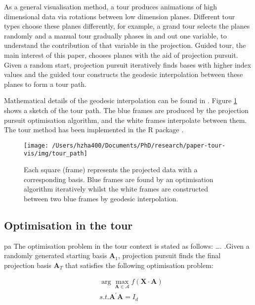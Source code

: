 As a general visualisation method, a tour produces animations of high
dimensional data via rotations between low dimension planes. Different
tour types choose these planes differently, for example, a grand tour
\citep{cook2008grand} selects the planes randomly and a manual tour
\citep{cook1997manual} gradually phases in and out one variable, to
understand the contribution of that variable in the projection. Guided
tour, the main interest of this paper, chooses planes with the aid of
projection pursuit. Given a random start, projection pursuit iteratively
finds bases with higher index values and the guided tour constructs the
geodesic interpolation between these planes to form a tour path.

Mathematical details of the geodesic interpolation can be found in
\citet{buja2005computational}. Figure \ref{fig:tour-path} shows a sketch
of the tour path. The blue frames are produced by the projection pursuit
optimisation algorithm, and the white frames interpolate between them.
The tour method has been implemented in the R package 
\citep{tourr}.

\begin{Schunk}
\begin{figure}

{\centering \texttt{[image: /Users/hzha400/Documents/PhD/research/paper-tour-vis/img/tour\_path]} 

}

\caption[Each square (frame) represents the projected data with a corresponding basis]{Each square (frame) represents the projected data with a corresponding basis. Blue frames are found by an optimisation algorithm iteratively whilst the white frames are constructed between two blue frames by geodesic interpolation.}\label{fig:tour-path}
\end{figure}
\end{Schunk}

\hypertarget{tour-optim}{%
\subsection{Optimisation in the tour}\label{tour-optim}}

pa The optimisation problem in the tour context is stated as follows:
\ldots. .Given a randomly generated starting basis \(\mathbf{A}_1\),
projection pursuit finds the final projection basis \(\mathbf{A}_T\)
that satisfies the following optimisation problem:

\begin{align}
&\arg \max_{\mathbf{A} \in \mathcal{A}} f(\mathbf{X} \cdot \mathbf{A}) \\
&s.t.  \mathbf{A}^{\prime} \mathbf{A} = I_d
\end{align}

